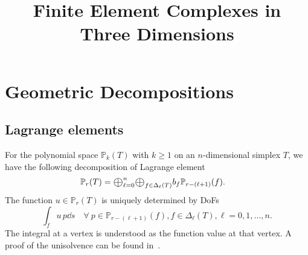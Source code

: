 \documentclass[10pt]{amsart}
\newcommand{\Oplus}{\ensuremath{\vcenter{\hbox{\scalebox{1.5}{$\oplus$}}}}}
\begin{document}
\title{Finite Element Complexes in Three Dimensions}


\maketitle

\tableofcontents



\section{Geometric Decompositions}
\subsection{Lagrange elements}
For the polynomial space $\mathbb P_k(T)$ with $k\geq 1$ on an $n$-dimensional simplex $T$, we have the following decomposition of Lagrange element~\cite[(2.6)]{ArnoldFalkWinther2009}
\begin{align}
\label{eq:Prdec}
\mathbb P_r(T) &= \Oplus_{\ell = 0}^n\Oplus_{f\in \Delta_{\ell}(T)} b_f\mathbb P_{r - (\ell +1)} (f).
\end{align}
The function $u\in \mathbb P_r(T)$ is uniquely determined by DoFs
\begin{equation}\label{eq:dofPr}
\int_f u \, p \dd s \quad \forall~p\in \mathbb P_{r - (\ell +1)} (f), f\in \Delta_{\ell}(T), \ell = 0,1,\ldots, n.
\end{equation}
The integral at a vertex is understood as the function value at that vertex. A proof of the unisolvence can be found in~\cite{Chen;Huang:2021Geometric}.
\end{document}
